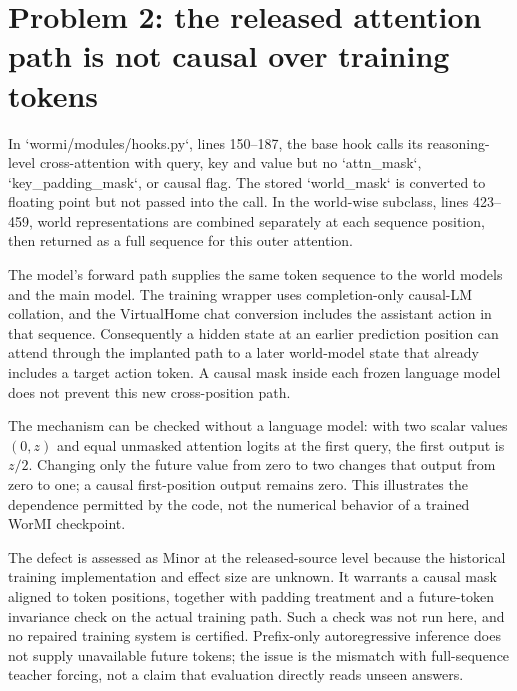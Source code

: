 \documentclass[10pt]{article}
\begin{document}
\section*{Problem 2: the released attention path is not causal over training tokens}
In `wormi/modules/hooks.py`, lines 150–187, the base hook calls its reasoning-level cross-attention with query, key and value but no `attn\_mask`, `key\_padding\_mask`, or causal flag. The stored `world\_mask` is converted to floating point but not passed into the call. In the world-wise subclass, lines 423–459, world representations are combined separately at each sequence position, then returned as a full sequence for this outer attention.\par
The model’s forward path supplies the same token sequence to the world models and the main model. The training wrapper uses completion-only causal-LM collation, and the VirtualHome chat conversion includes the assistant action in that sequence. Consequently a hidden state at an earlier prediction position can attend through the implanted path to a later world-model state that already includes a target action token. A causal mask inside each frozen language model does not prevent this new cross-position path.\par
The mechanism can be checked without a language model: with two scalar values \((0,z)\) and equal unmasked attention logits at the first query, the first output is \(z/2\). Changing only the future value from zero to two changes that output from zero to one; a causal first-position output remains zero. This illustrates the dependence permitted by the code, not the numerical behavior of a trained WorMI checkpoint.\par
The defect is assessed as Minor at the released-source level because the historical training implementation and effect size are unknown. It warrants a causal mask aligned to token positions, together with padding treatment and a future-token invariance check on the actual training path. Such a check was not run here, and no repaired training system is certified. Prefix-only autoregressive inference does not supply unavailable future tokens; the issue is the mismatch with full-sequence teacher forcing, not a claim that evaluation directly reads unseen answers.\par
\end{document}
